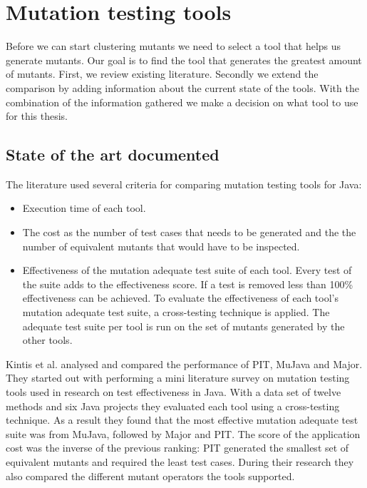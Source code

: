 \documentclass[../main]{subfiles}
\begin{document}
\chapter{Mutation testing tools}
\label{ch:mutation-tool}

Before we can start clustering mutants we need to select a tool that helps us generate mutants. 
Our goal is to find the tool that generates the greatest amount of mutants. 
\newline
First, we review existing literature. 
Secondly we extend the comparison by adding information about the current state of the tools.
With the combination of the information gathered we make a decision on what tool to use for this thesis.

\section{State of the art documented}
\label{ch:tooling-literature}
The literature used several criteria for comparing mutation testing tools for Java:
\begin{itemize}
  \item Execution time of each tool.
  \item The cost as the number of test cases that needs to be generated and the the number of equivalent mutants that would have to be inspected.
  \item Effectiveness of the mutation adequate test suite of each tool. Every test of the suite adds to the effectiveness score. If a test is removed less than 100\% effectiveness can be achieved. To evaluate the effectiveness of each tool's mutation adequate test suite, a cross-testing technique is applied. The adequate test suite per tool is run on the set of mutants generated by the other tools.
\end{itemize}
Kintis et al. analysed and compared the performance of PIT,  MuJava and Major\cite{Kintis2016AnalysingStudy}. 
They started out with performing a mini literature survey on mutation testing tools used in research on test effectiveness in Java. 
With a data set of twelve methods and six Java projects they evaluated each tool using a cross-testing technique.
As a result they found that the most effective mutation adequate test suite was from MuJava, followed by Major and PIT.
The score of the application cost was the inverse of the previous ranking: PIT generated the smallest set of equivalent mutants and required the least test cases.
During their research they also compared the different mutant operators the tools supported. 
\end{document}
